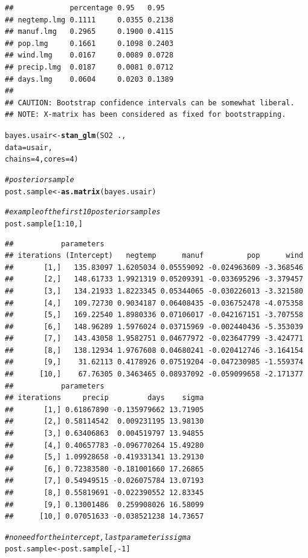 \documentclass[11pt,a4paper,twoside]{book}
\makeatletter
\newcommand{\hlnum}[1]{\textcolor[rgb]{0.686,0.059,0.569}{#1}}%
\newcommand{\hlcom}[1]{\textcolor[rgb]{0.678,0.584,0.686}{\textit{#1}}}%
\newcommand{\hlopt}[1]{\textcolor[rgb]{0,0,0}{#1}}%
\newcommand{\hlstd}[1]{\textcolor[rgb]{0.345,0.345,0.345}{#1}}%
\newcommand{\hlkwb}[1]{\textcolor[rgb]{0.69,0.353,0.396}{#1}}%
\newcommand{\hlkwc}[1]{\textcolor[rgb]{0.333,0.667,0.333}{#1}}%
\newcommand{\hlkwd}[1]{\textcolor[rgb]{0.737,0.353,0.396}{\textbf{#1}}}%
\newenvironment{kframe}{%
 \def\at@end@of@kframe{}%
 \ifinner\ifhmode%
  \def\at@end@of@kframe{\end{minipage}}%
  \begin{minipage}{\columnwidth}%
 \fi\fi%
 \def\FrameCommand##1{\hskip\@totalleftmargin \hskip-\fboxsep
 \colorbox{shadecolor}{##1}\hskip-\fboxsep
     \hskip-\linewidth \hskip-\@totalleftmargin \hskip\columnwidth}%
 \MakeFramed {\advance\hsize-\width
   \@totalleftmargin\z@ \linewidth\hsize
   \@setminipage}}%
 {\par\unskip\endMakeFramed%
 \at@end@of@kframe}
\newenvironment{knitrout}{}{} %
\makeatother
\begin{document}
\begin{knitrout}
\begin{kframe}
\begin{verbatim}
##             percentage 0.95   0.95  
## negtemp.lmg 0.1111     0.0355 0.2138
## manuf.lmg   0.2965     0.1900 0.4115
## pop.lmg     0.1661     0.1098 0.2403
## wind.lmg    0.0167     0.0089 0.0728
## precip.lmg  0.0187     0.0081 0.0712
## days.lmg    0.0604     0.0203 0.1389
## 
## CAUTION: Bootstrap confidence intervals can be somewhat liberal. 
## NOTE: X-matrix has been considered as fixed for bootstrapping.
\end{verbatim}
\begin{alltt}
\hlstd{bayes.usair} \hlkwb{<-} \hlkwd{stan_glm}\hlstd{(SO2} \hlopt{~} \hlstd{. ,}
                  \hlkwc{data} \hlstd{= usair,}
                  \hlkwc{chains} \hlstd{=} \hlnum{4}\hlstd{,} \hlkwc{cores} \hlstd{=} \hlnum{4}\hlstd{)}

\hlcom{#posterior sample}
\hlstd{post.sample} \hlkwb{<-} \hlkwd{as.matrix}\hlstd{(bayes.usair)}

\hlcom{#example of the first 10 posterior samples}
\hlstd{post.sample[}\hlnum{1}\hlopt{:}\hlnum{10}\hlstd{,]}
\end{alltt}
\begin{verbatim}
##           parameters
## iterations (Intercept)   negtemp      manuf          pop      wind
##       [1,]   135.83097 1.6205034 0.05559092 -0.024963609 -3.368546
##       [2,]   148.61733 1.9921319 0.05209391 -0.033695296 -3.379457
##       [3,]   134.21933 1.8223345 0.05344065 -0.030226013 -3.321580
##       [4,]   109.72730 0.9034187 0.06408435 -0.036752478 -4.075358
##       [5,]   169.22540 1.8980336 0.07106017 -0.042167151 -3.707558
##       [6,]   148.96289 1.5976024 0.03715969 -0.002440436 -5.353039
##       [7,]   143.43058 1.9582751 0.04677972 -0.023647799 -3.424771
##       [8,]   138.12934 1.9767608 0.04680241 -0.020412746 -3.164154
##       [9,]    31.62113 0.4178926 0.07519204 -0.047230985 -1.559374
##      [10,]    67.76305 0.3463465 0.08937092 -0.059099658 -2.171377
##           parameters
## iterations     precip         days    sigma
##       [1,] 0.61867890 -0.135979662 13.71905
##       [2,] 0.58114542  0.009231195 13.98130
##       [3,] 0.63406863  0.004519797 13.94855
##       [4,] 0.40657783 -0.096770264 15.49280
##       [5,] 1.09928658 -0.419331341 13.29130
##       [6,] 0.72383580 -0.181001660 17.26865
##       [7,] 0.54949515 -0.026075784 13.07193
##       [8,] 0.55819691 -0.022390552 12.83345
##       [9,] 0.13001486  0.259908026 16.58099
##      [10,] 0.07051633 -0.038521238 14.73657
\end{verbatim}
\begin{alltt}
\hlcom{#no need for the intercept, last parameter is sigma}
\hlstd{post.sample} \hlkwb{<-} \hlstd{post.sample[,}\hlopt{-}\hlnum{1}\hlstd{]}


\end{alltt}
\end{kframe}
\end{knitrout}
\end{document}
